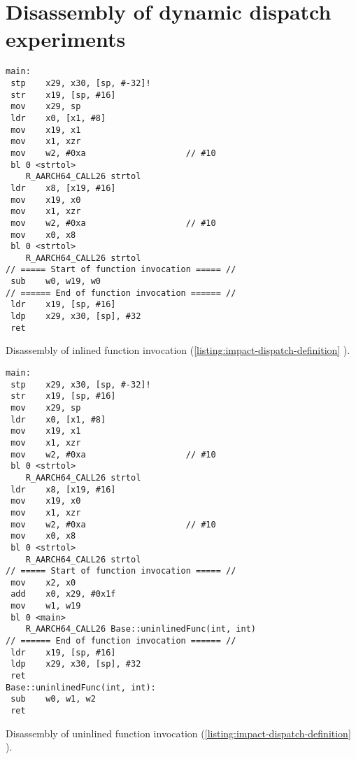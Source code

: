 \chapter{Disassembly of dynamic dispatch experiments}
\label{chap:impact-disassembly}


\vspace{2em}
\begin{code}
    \begin{verbatim}
main:
 stp	x29, x30, [sp, #-32]!
 str	x19, [sp, #16]
 mov	x29, sp
 ldr	x0, [x1, #8]
 mov	x19, x1
 mov	x1, xzr
 mov	w2, #0xa                   	// #10
 bl	0 <strtol>
    R_AARCH64_CALL26 strtol
 ldr	x8, [x19, #16]
 mov	x19, x0
 mov	x1, xzr
 mov	w2, #0xa                   	// #10
 mov	x0, x8
 bl	0 <strtol>
    R_AARCH64_CALL26 strtol
// ===== Start of function invocation ===== //
 sub	w0, w19, w0
// ====== End of function invocation ====== //
 ldr	x19, [sp, #16]
 ldp	x29, x30, [sp], #32
 ret
    \end{verbatim}
    \caption{Disassembly of inlined function invocation (\autoref{listing:impact-dispatch-definition} ).}
    \label{listing:impact-dispatch-inlined-disassembly}
\end{code}


\vspace{2em}
\begin{code}
    \begin{verbatim}
main:
 stp	x29, x30, [sp, #-32]!
 str	x19, [sp, #16]
 mov	x29, sp
 ldr	x0, [x1, #8]
 mov	x19, x1
 mov	x1, xzr
 mov	w2, #0xa                   	// #10
 bl	0 <strtol>
    R_AARCH64_CALL26 strtol
 ldr	x8, [x19, #16]
 mov	x19, x0
 mov	x1, xzr
 mov	w2, #0xa                   	// #10
 mov	x0, x8
 bl	0 <strtol>
    R_AARCH64_CALL26 strtol
// ===== Start of function invocation ===== //
 mov	x2, x0
 add	x0, x29, #0x1f
 mov	w1, w19
 bl	0 <main>
    R_AARCH64_CALL26 Base::uninlinedFunc(int, int)
// ====== End of function invocation ====== //
 ldr	x19, [sp, #16]
 ldp	x29, x30, [sp], #32
 ret
Base::uninlinedFunc(int, int):
 sub	w0, w1, w2
 ret
    \end{verbatim}
    \caption{Disassembly of uninlined function invocation (\autoref{listing:impact-dispatch-definition} ).}
    \label{listing:impact-dispatch-uninlined-disassembly}
\end{code}


